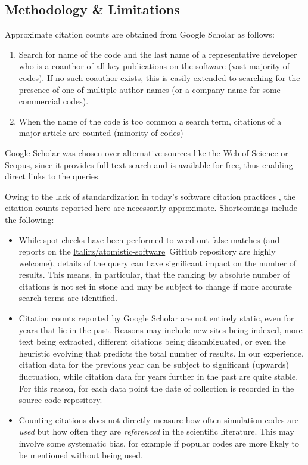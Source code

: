 \documentclass[9pt,review]{livecoms}
\newcommand{\atsoftgit}{\href{https://github.com/ltalirz/atomistic-software}{ltalirz/atomistic-software}\ }
\begin{document}
\label{sec:methodology}
\subsection{Methodology \& Limitations}

Approximate citation counts are obtained from Google Scholar as follows:
\begin{enumerate}
    \item Search for name of the code and the last name of a representative developer who is a coauthor of all key publications on the software (vast majority of codes). 
        If no such coauthor exists, this is easily extended to searching for the presence of one of multiple author names (or a company name for some commercial codes).
    \item When the name of the code is too common a search term, citations of a major article are counted (minority of codes)
\end{enumerate}
Google Scholar was chosen over alternative sources like the Web of Science or Scopus, since it provides full-text search and is available for free, thus enabling direct links to the queries.


Owing to the lack of standardization in today's software citation practices \cite{vandeSandt2019a,vandeSandt2020}, the citation counts reported here are necessarily approximate.
Shortcomings include the following:
\begin{itemize}
    \item While spot checks have been performed to weed out false matches (and reports on the \atsoftgit GitHub repository are highly welcome), details of the query can have significant impact on the number of results.
        This means, in particular, that the ranking by absolute number of citations is not set in stone and may be subject to change if more accurate search terms are identified. 
    \item Citation counts reported by Google Scholar are not entirely static, even for years that lie in the past. 
Reasons may include new sites being indexed, more text being extracted, different citations being disambiguated, or even the heuristic evolving that predicts the total number of results. 
In our experience, citation data for the previous year can be subject to significant (upwards) fluctuation, while citation data for years further in the past are quite stable.
For this reason, for each data point the date of collection is recorded in the source code repository.
    \item Counting citations does not directly measure how often simulation codes are \emph{used} but how often they are \emph{referenced} in the scientific literature.
This may involve some systematic bias, for example if popular codes are more likely to be mentioned without being used.
\end{itemize}
\end{document}
